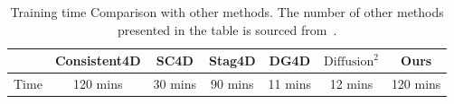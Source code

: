 \begin{table*}[h]
\caption{Training time Comparison with other methods. The number of other methods presented in the table is sourced from~\cite{yang2024diffusion}.}
\vspace{1pt}
\setlength{\tabcolsep}{0.25em} %
\centering
\begin{tabular}{lcccccc}
\toprule
 & Consistent4D & SC4D & Stag4D & DG4D & $\text{Diffusion}^2$ & Ours    \\
\midrule
Time & 120 mins & 30 mins & 90 mins  & 11 mins & 12 mins & 120 mins \\
\bottomrule
\end{tabular}%
\label{tab:time}
\end{table*}

